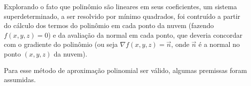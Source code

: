 Explorando o fato que polinômio são lineares em seus coeficientes, um sistema
superdeterminado, a ser resolvido por mínimo quadrados, foi contruído a partir
do cálculo dos termos do polinômio em cada ponto da nuvem (fazendo $f(x,y,z)=0$)
e da avaliação da normal em cada ponto, que deveria concordar com o gradiente do
polinômio (ou seja $\nabla f(x,y,z) = \overrightarrow{n}$, onde
$\overrightarrow{n}$ é a normal no ponto $(x,y,z)$ da nuvem).

Para esse método de aproximação polinomial ser válido, algumas premissas foram
assumidas. 



% 

